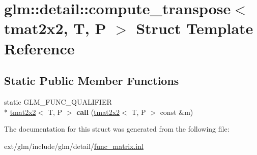 \hypertarget{structglm_1_1detail_1_1compute__transpose_3_01tmat2x2_00_01_t_00_01_p_01_4}{\section{glm\-:\-:detail\-:\-:compute\-\_\-transpose$<$ tmat2x2, T, P $>$ Struct Template Reference}
\label{structglm_1_1detail_1_1compute__transpose_3_01tmat2x2_00_01_t_00_01_p_01_4}
}
\subsection*{Static Public Member Functions}
\begin{DoxyCompactItemize}
\item 
\hypertarget{structglm_1_1detail_1_1compute__transpose_3_01tmat2x2_00_01_t_00_01_p_01_4_a2a0e412640848cca363b201a1a988ddb}{static G\-L\-M\-\_\-\-F\-U\-N\-C\-\_\-\-Q\-U\-A\-L\-I\-F\-I\-E\-R \\*
\hyperlink{structglm_1_1tmat2x2}{tmat2x2}$<$ T, P $>$ {\bfseries call} (\hyperlink{structglm_1_1tmat2x2}{tmat2x2}$<$ T, P $>$ const \&m)}\label{structglm_1_1detail_1_1compute__transpose_3_01tmat2x2_00_01_t_00_01_p_01_4_a2a0e412640848cca363b201a1a988ddb}

\end{DoxyCompactItemize}


The documentation for this struct was generated from the following file\-:\begin{DoxyCompactItemize}
\item 
ext/glm/include/glm/detail/\hyperlink{func__matrix_8inl}{func\-\_\-matrix.\-inl}\end{DoxyCompactItemize}
